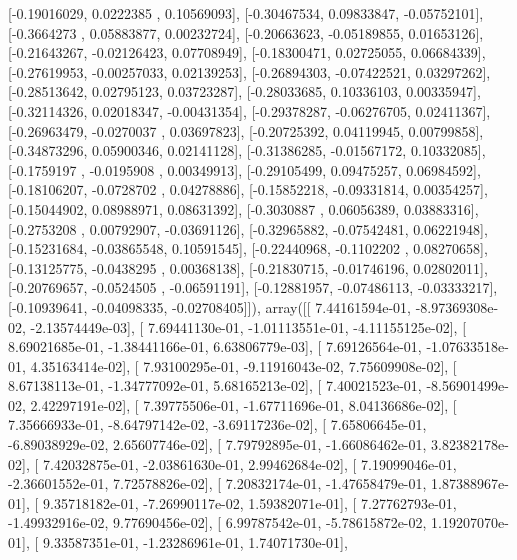 \documentclass{article}
\begin{document}
       [-0.19016029,  0.0222385 ,  0.10569093],
       [-0.30467534,  0.09833847, -0.05752101],
       [-0.3664273 ,  0.05883877,  0.00232724],
       [-0.20663623, -0.05189855,  0.01653126],
       [-0.21643267, -0.02126423,  0.07708949],
       [-0.18300471,  0.02725055,  0.06684339],
       [-0.27619953, -0.00257033,  0.02139253],
       [-0.26894303, -0.07422521,  0.03297262],
       [-0.28513642,  0.02795123,  0.03723287],
       [-0.28033685,  0.10336103,  0.00335947],
       [-0.32114326,  0.02018347, -0.00431354],
       [-0.29378287, -0.06276705,  0.02411367],
       [-0.26963479, -0.0270037 ,  0.03697823],
       [-0.20725392,  0.04119945,  0.00799858],
       [-0.34873296,  0.05900346,  0.02141128],
       [-0.31386285, -0.01567172,  0.10332085],
       [-0.1759197 , -0.0195908 ,  0.00349913],
       [-0.29105499,  0.09475257,  0.06984592],
       [-0.18106207, -0.0728702 ,  0.04278886],
       [-0.15852218, -0.09331814,  0.00354257],
       [-0.15044902,  0.08988971,  0.08631392],
       [-0.3030887 ,  0.06056389,  0.03883316],
       [-0.2753208 ,  0.00792907, -0.03691126],
       [-0.32965882, -0.07542481,  0.06221948],
       [-0.15231684, -0.03865548,  0.10591545],
       [-0.22440968, -0.1102202 ,  0.08270658],
       [-0.13125775, -0.0438295 ,  0.00368138],
       [-0.21830715, -0.01746196,  0.02802011],
       [-0.20769657, -0.0524505 , -0.06591191],
       [-0.12881957, -0.07486113, -0.03333217],
       [-0.10939641, -0.04098335, -0.02708405]]), array([[  7.44161594e-01,  -8.97369308e-02,  -2.13574449e-03],
       [  7.69441130e-01,  -1.01113551e-01,  -4.11155125e-02],
       [  8.69021685e-01,  -1.38441166e-01,   6.63806779e-03],
       [  7.69126564e-01,  -1.07633518e-01,   4.35163414e-02],
       [  7.93100295e-01,  -9.11916043e-02,   7.75609908e-02],
       [  8.67138113e-01,  -1.34777092e-01,   5.68165213e-02],
       [  7.40021523e-01,  -8.56901499e-02,   2.42297191e-02],
       [  7.39775506e-01,  -1.67711696e-01,   8.04136686e-02],
       [  7.35666933e-01,  -8.64797142e-02,  -3.69117236e-02],
       [  7.65806645e-01,  -6.89038929e-02,   2.65607746e-02],
       [  7.79792895e-01,  -1.66086462e-01,   3.82382178e-02],
       [  7.42032875e-01,  -2.03861630e-01,   2.99462684e-02],
       [  7.19099046e-01,  -2.36601552e-01,   7.72578826e-02],
       [  7.20832174e-01,  -1.47658479e-01,   1.87388967e-01],
       [  9.35718182e-01,  -7.26990117e-02,   1.59382071e-01],
       [  7.27762793e-01,  -1.49932916e-02,   9.77690456e-02],
       [  6.99787542e-01,  -5.78615872e-02,   1.19207070e-01],
       [  9.33587351e-01,  -1.23286961e-01,   1.74071730e-01],
\end{document}
